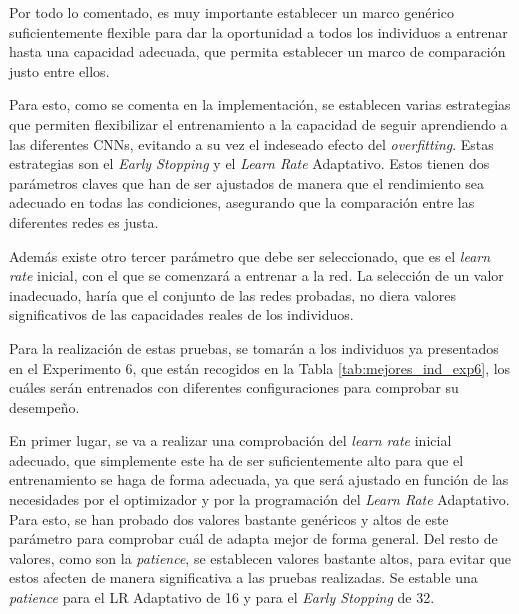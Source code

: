 Por todo lo comentado, es muy importante establecer un marco genérico suficientemente flexible para dar la oportunidad a todos los individuos a entrenar hasta una capacidad adecuada, que permita establecer un marco de comparación justo entre ellos.

Para esto, como se comenta en la implementación, se establecen varias estrategias que permiten flexibilizar el entrenamiento a la capacidad de seguir aprendiendo a las diferentes CNNs, evitando a su vez el indeseado efecto del \textit{overfitting}. Estas estrategias son el \textit{Early Stopping} y el \textit{Learn Rate} Adaptativo. Estos tienen dos parámetros claves que han de ser ajustados de manera que el rendimiento sea adecuado en todas las condiciones, asegurando que la comparación entre las diferentes redes es justa.

Además existe otro tercer parámetro que debe ser seleccionado, que es el \textit{learn rate} inicial, con el que se comenzará a entrenar a la red. La selección de un valor inadecuado, haría que el conjunto de las redes probadas, no diera valores significativos de las capacidades reales de los individuos.

Para la realización de estas pruebas, se tomarán a los individuos ya presentados en el Experimento 6, que están recogidos en la Tabla \ref{tab:mejores_ind_exp6}, los cuáles serán entrenados con diferentes configuraciones para comprobar su desempeño.

En primer lugar, se va a realizar una comprobación del \textit{learn rate} inicial adecuado, que simplemente este ha de ser suficientemente alto para que el entrenamiento se haga de forma adecuada, ya que será ajustado en función de las necesidades por el optimizador y por la programación del \textit{Learn Rate} Adaptativo. Para esto, se han probado dos valores bastante genéricos y altos de este parámetro para comprobar cuál de adapta mejor de forma general. Del resto de valores, como son la \textit{patience}, se establecen valores bastante altos, para evitar que estos afecten de manera significativa a las pruebas realizadas. Se estable una \textit{patience} para el LR Adaptativo de 16 y para el \textit{Early Stopping} de 32.


